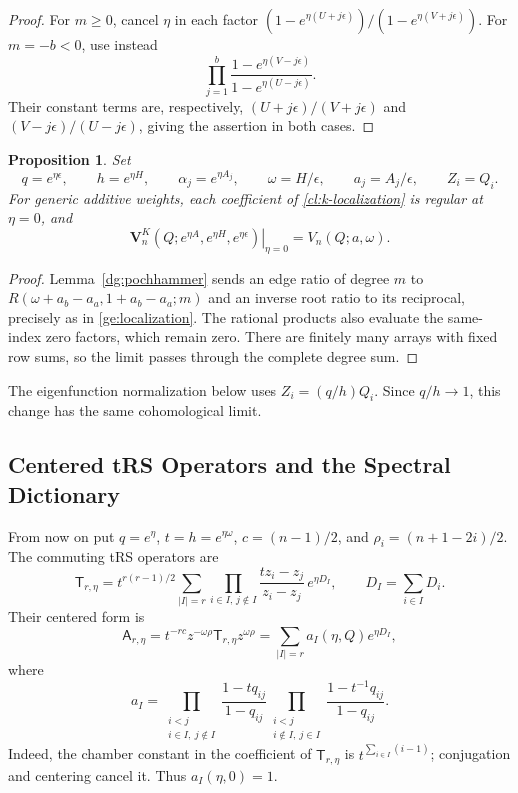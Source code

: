 \documentclass[11pt]{amsart}
\newtheorem{proposition}[theorem]{Proposition}
\theoremstyle{definition}
\theoremstyle{remark}
\numberwithin{equation}{section}
\newcommand{\eps}{\epsilon}
\begin{document}
\begin{proof}
For $m\geq0$, cancel $\eta$ in each factor
$(1-e^{\eta(U+j\eps)})/(1-e^{\eta(V+j\eps)})$.
For $m=-b<0$, use instead
\[
 \prod_{j=1}^b
 \frac{1-e^{\eta(V-j\eps)}}{1-e^{\eta(U-j\eps)}}.
\]
Their constant terms are, respectively,
$(U+j\eps)/(V+j\eps)$ and
$(V-j\eps)/(U-j\eps)$, giving the assertion in both cases.
\end{proof}

\begin{proposition}\label{cl:generic-limit}
Set
\[
 q=e^{\eta\eps},\qquad h=e^{\eta H},\qquad
 \alpha_j=e^{\eta A_j},\qquad
 \omega=H/\eps,\qquad a_j=A_j/\eps,\qquad Z_i=Q_i.
\]
For generic additive weights, each coefficient of
\eqref{cl:k-localization} is regular at $\eta=0$, and
\begin{equation}\label{cl:vertex-limit}
 \left.\mathbf V_n^K(Q;e^{\eta A},e^{\eta H},e^{\eta\eps})
 \right|_{\eta=0}=V_n(Q;a,\omega).
\end{equation}
\end{proposition}

\begin{proof}
Lemma~\ref{dg:pochhammer} sends an edge ratio of degree $m$ to
$R(\omega+a_b-a_a,1+a_b-a_a;m)$ and an inverse root ratio to
its reciprocal, precisely as in \eqref{ge:localization}.
The rational products also evaluate the same-index zero factors,
which remain zero. There are finitely many arrays with fixed row
sums, so the limit passes through the complete degree sum.
\end{proof}

The eigenfunction normalization below uses $Z_i=(q/h)Q_i$.
Since $q/h\to1$, this change has the same cohomological limit.

\subsection{Centered tRS Operators and the Spectral Dictionary}
From now on put
$q=e^\eta$, $t=h=e^{\eta\omega}$,
$c=(n-1)/2$, and $\rho_i=(n+1-2i)/2$.
The commuting tRS operators are
\begin{equation}\label{dg:raw-family}
 \mathsf T_{r,\eta}=t^{r(r-1)/2}
 \sum_{|I|=r}\prod_{i\in I,\,j\notin I}
 \frac{tz_i-z_j}{z_i-z_j}\,e^{\eta D_I},
 \qquad D_I=\sum_{i\in I}D_i.
\end{equation}
Their centered form is
\begin{equation}\label{dg:normalized-trs}
 \mathsf A_{r,\eta}
 =t^{-rc}z^{-\omega\rho}\mathsf T_{r,\eta}z^{\omega\rho}
 =\sum_{|I|=r}a_I(\eta,Q)e^{\eta D_I},
\end{equation}
where
\begin{equation}\label{dg:chamber-family}
 a_I=
 \prod_{\substack{i<j\\i\in I,\ j\notin I}}
 \frac{1-tq_{ij}}{1-q_{ij}}
 \prod_{\substack{i<j\\i\notin I,\ j\in I}}
 \frac{1-t^{-1}q_{ij}}{1-q_{ij}}.
\end{equation}
Indeed, the chamber constant in the coefficient of
$\mathsf T_{r,\eta}$ is $t^{\sum_{i\in I}(i-1)}$;
conjugation and centering cancel it. Thus $a_I(\eta,0)=1$.
\end{document}
